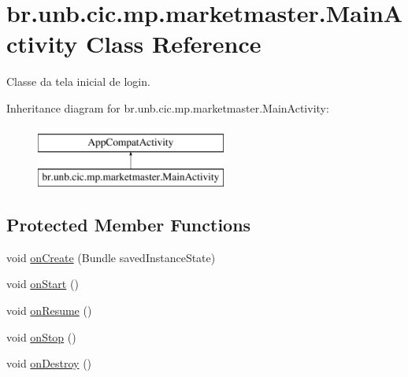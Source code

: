 \hypertarget{classbr_1_1unb_1_1cic_1_1mp_1_1marketmaster_1_1MainActivity}{}\section{br.\+unb.\+cic.\+mp.\+marketmaster.\+Main\+Activity Class Reference}
\label{classbr_1_1unb_1_1cic_1_1mp_1_1marketmaster_1_1MainActivity}


Classe da tela inicial de login.  


Inheritance diagram for br.\+unb.\+cic.\+mp.\+marketmaster.\+Main\+Activity\+:\begin{figure}[H]
\begin{center}
\leavevmode
\includegraphics[height=2.000000cm]{classbr_1_1unb_1_1cic_1_1mp_1_1marketmaster_1_1MainActivity}
\end{center}
\end{figure}
\subsection*{Protected Member Functions}
\begin{DoxyCompactItemize}
\item 
void \mbox{\hyperlink{classbr_1_1unb_1_1cic_1_1mp_1_1marketmaster_1_1MainActivity_a9d8b59bdb1f382c38a907edabbb8c03d}{on\+Create}} (Bundle saved\+Instance\+State)
\item 
void \mbox{\hyperlink{classbr_1_1unb_1_1cic_1_1mp_1_1marketmaster_1_1MainActivity_a81a8a03819b6653645b4b4fca9eecae2}{on\+Start}} ()
\item 
void \mbox{\hyperlink{classbr_1_1unb_1_1cic_1_1mp_1_1marketmaster_1_1MainActivity_a8d6fcf56f54d8c3f777ae07c020dfeb3}{on\+Resume}} ()
\item 
void \mbox{\hyperlink{classbr_1_1unb_1_1cic_1_1mp_1_1marketmaster_1_1MainActivity_a48b34ad8f11248a692a5167a0ead9fac}{on\+Stop}} ()
\item 
void \mbox{\hyperlink{classbr_1_1unb_1_1cic_1_1mp_1_1marketmaster_1_1MainActivity_a426f0769b125927ff1153a17e2cdf3c8}{on\+Destroy}} ()
\end{DoxyCompactItemize}
